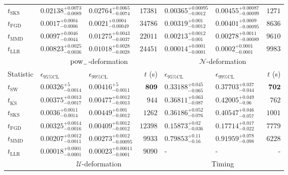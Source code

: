 \begin{tabular}{l|llr|llr}
	$t_{\mathrm{SKS}}$ & $0.02138_{-0.0089}^{+0.0073}$ & $0.02764_{-0.0074}^{+0.0065}$ & $17381$ & $0.00365_{-0.0012}^{+0.00095}$ & $0.00455_{-0.00099}^{+0.00087}$ & $1271$ \\
	$t_{\mathrm{FGD}}$ & ${\mathbf{0.0017_{-0.0006}^{+0.0004}}}$ & ${\mathbf{0.0021_{-0.00049}^{+0.0004}}}$ & $34786$ & $0.00319_{-0.0012}^{+0.001}$ & $0.00401_{-0.00095}^{+0.0009}$ & $8636$ \\
	$t_{\mathrm{MMD}}$ & $0.0097_{-0.0044}^{+0.0046}$ & $0.01275_{-0.0037}^{+0.0043}$ & $22011$ & ${\mathbf{0.00213_{-0.001}^{+0.0012}}}$ & ${\mathbf{0.00278_{-0.00089}^{+0.0011}}}$ & $9610$ \\
	$t_{\mathrm{LLR}}$ & $0.00823_{-0.0036}^{+0.0025}$ & $0.01018_{-0.0028}^{+0.0028}$ & $24451$ & $0.00014_{-0.0001}^{+0.0001}$ & $0.0002_{-0.0001}^{+0.0001}$ & $9983$ \\
	\toprule
	\multicolumn{1}{c}{} & \multicolumn{3}{c}{$\rm{pow}_{-}$-deformation} & \multicolumn{3}{c}{$\mathcal{N}$-deformation} \\
	Statistic & $\epsilon_{95\%\mathrm{CL}}$ & $\epsilon_{99\%\mathrm{CL}}$ & $t$ (s) & $\epsilon_{95\%\mathrm{CL}}$ & $\epsilon_{99\%\mathrm{CL}}$ & $t$ (s) \\
	\midrule
	$t_{\mathrm{SW}}$ & $0.00326_{-0.0014}^{+5}$ & $0.00416_{-0.0011}^{+5}$ & ${\mathbf{809}}$ & $0.33188_{-0.065}^{+0.045}$ & $0.37703_{-0.044}^{+0.037}$ & ${\mathbf{702}}$ \\
	$t_{\overline{\mathrm{KS}}}$ & $0.00375_{-0.0017}^{+0.0013}$ & $0.00477_{-0.0013}^{+0.0012}$ & $944$ & $0.36811_{-0.087}^{+0.063}$ & $0.42005_{-0.06}^{+0.049}$ & $762$ \\
	$t_{\mathrm{SKS}}$ & $0.0036_{-0.0014}^{+0.0011}$ & $0.00449_{-0.0012}^{+0.001}$ & $1262$ & $0.36186_{-0.076}^{+0.052}$ & $0.40547_{-0.057}^{+0.046}$ & $1001$ \\
	$t_{\mathrm{FGD}}$ & $0.00325_{-0.0016}^{+0.0014}$ & $0.00409_{-0.0012}^{+0.0012}$ & $12398$ & ${\mathbf{0.15873_{-0.036}^{+0.02}}}$ & ${\mathbf{0.17714_{-0.022}^{+0.017}}}$ & $7779$ \\
	$t_{\mathrm{MMD}}$ & ${\mathbf{0.00207_{-0.0011}^{+0.0012}}}$ & ${\mathbf{0.00273_{-0.00095}^{+0.0012}}}$ & $9933$ & $0.79853_{-0.16}^{+0.11}$ & $0.91959_{-0.098}^{+0.078}$ & $6228$ \\
	$t_{\mathrm{LLR}}$ & $0.00018_{-0.0001}^{+0.0001}$ & $0.00023_{-0.0001}^{+0.00011}$ & $9090$ & - & - & - \\
	\toprule
	\multicolumn{1}{c}{} & \multicolumn{3}{c}{$\mathcal{U}$-deformation} & \multicolumn{3}{c}{Timing} \\

\end{tabular}

